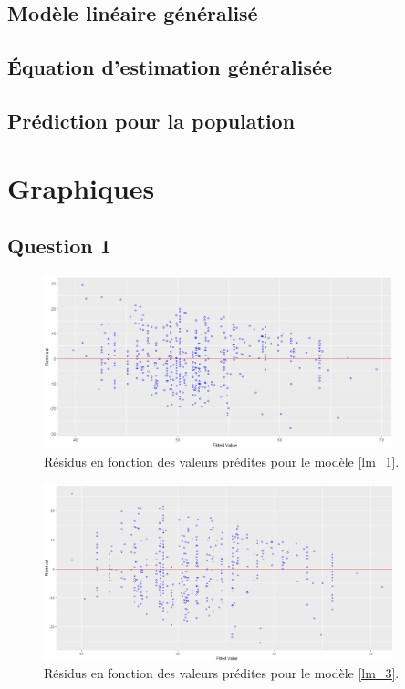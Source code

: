 \documentclass{article}
\begin{document}
	\subsection{Modèle linéaire généralisé}
	
	\subsection{Équation d'estimation généralisée}
	
	\subsection{Prédiction pour la population}
	
	
\newpage
\appendix
\section{Graphiques}
\renewcommand\thesubsection{\thesection.\arabic{subsection}}
\subsection{Question 1}

\begin{figure}[H]  %
	\centering
	\includegraphics[width=0.9\textwidth]{graphiques/residus_VS_predicitions_lm1}
	\caption{Résidus en fonction des valeurs prédites pour le modèle \eqref{lm_1}.}
	\label{residus_VS_predicitions_lm1}
\end{figure}

\begin{figure}[H]  %
	\centering
	\includegraphics[width=0.9\textwidth]{graphiques/residus_VS_predicitions_lm2}
	\caption{Résidus en fonction des valeurs prédites pour le modèle \eqref{lm_3}.}
	\label{residus_VS_predicitions_lm3}
\end{figure}
\end{document}
